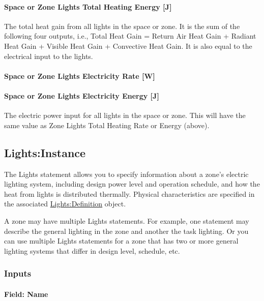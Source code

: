 \paragraph{Space or Zone Lights Total Heating Energy {[}J{]}}\label{zone-lights-total-heating-energy-j}

The total heat gain from all lights in the space or zone. It is the sum of the following four outputs, i.e., Total Heat Gain = Return Air Heat Gain + Radiant Heat Gain + Visible Heat Gain + Convective Heat Gain. It is also equal to the electrical input to the lights.

\paragraph{Space or Zone Lights Electricity Rate {[}W{]}}\label{zone-lights-electric-power-w}

\paragraph{Space or Zone Lights Electricity Energy {[}J{]}}\label{zone-lights-electric-energy-j}

The electric power input for all lights in the space or zone. This will have the same value as Zone Lights Total Heating Rate or Energy (above).


\subsection{Lights:Instance}\label{lightsinstance}

The Lights statement allows you to specify information about a zone's electric lighting system, including design power level and operation schedule, and how the heat from lights is distributed thermally. Physical characteristics are specified in the associated \hyperref[lightsdefinition]{Lights:Definition} object.

A zone may have multiple Lights statements. For example, one statement may describe the general lighting in the zone and another the task lighting. Or you can use multiple Lights statements for a zone that has two or more general lighting systems that differ in design level, schedule, etc.

\subsubsection{Inputs}\label{inputs-2-021-lights-instance}

\paragraph{Field: Name}\label{field-name-2-020-lights-instance}


